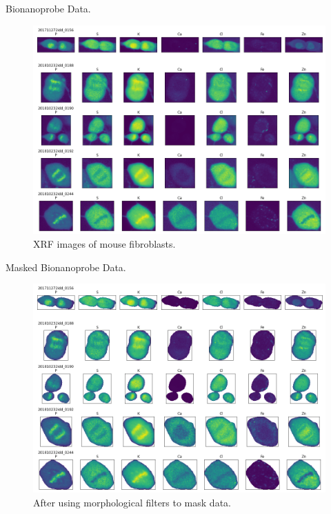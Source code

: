 \documentclass[
]{beamer}
\begin{document}
\begin{frame}{Bionanoprobe Data.}
\begin{figure}[h]
  \includegraphics[width=1\textwidth,height=.7\textheight,keepaspectratio]{unmasked.png}
  \caption{XRF images of mouse fibroblasts.
  }
\end{figure}
\end{frame}

\begin{frame}{Masked Bionanoprobe Data.}
\begin{figure}[h]
  \includegraphics[width=1\textwidth,height=.7\textheight,keepaspectratio]{masked.png}
  \caption{After using morphological filters to mask data.
  }
\end{figure}
\end{frame}
\end{document}
